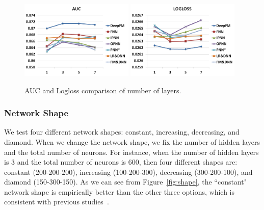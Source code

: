 \begin{figure}[ht]
\setlength{\abovecaptionskip}{0pt}%
\setlength{\belowcaptionskip}{-10pt}
\centering
\begin{minipage}[b]{0.5\textwidth}
\includegraphics[width=0.48\textwidth]{img/layer-auc.png}
\includegraphics[width=0.48\textwidth]{img/layer-logloss.png}
\end{minipage}
\caption{\footnotesize{AUC and Logloss comparison of number of layers.}}\label{fig:layer}
\end{figure}

\subsubsection{Network Shape}\label{sec:exp:hyper:shape}

We test four different network shapes: constant, increasing, decreasing, and diamond. When we change the network shape, we fix the number of hidden layers and the total number of neurons. For instance, when the number of hidden layers is 3 and the total number of neurons is 600, then four different shapes are: constant (200-200-200), increasing (100-200-300), decreasing (300-200-100), and diamond (150-300-150). As we can see from Figure~\ref{fig:shape}, the ``constant" network shape is empirically better than the other three options, which is consistent with previous studies~\cite{networkstructure09}.

